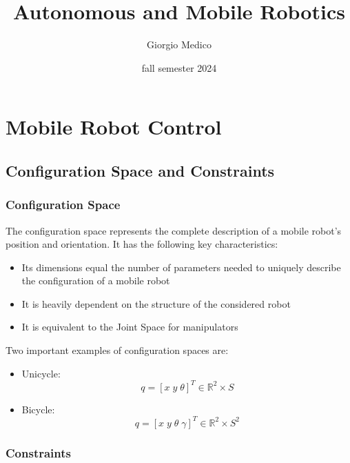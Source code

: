 \documentclass[openany]{book}
\title{Autonomous and Mobile Robotics}
\author{Giorgio Medico}
\date{fall semester 2024}
\newcommand{\R}{\mathbb{R}}
\theoremstyle{definition}
\theoremstyle{remark}
\begin{document}
\maketitle
\tableofcontents

\part{Mobile Robot Control}

\chapter{Configuration Space and Constraints}

\section{Configuration Space}

The configuration space represents the complete description of a mobile robot's position and orientation. It has the following key characteristics:

\begin{itemize}
    \item Its dimensions equal the number of parameters needed to uniquely describe the configuration of a mobile robot
    \item It is heavily dependent on the structure of the considered robot
    \item It is equivalent to the Joint Space for manipulators
\end{itemize}

Two important examples of configuration spaces are:

\begin{itemize}
    \item Unicycle:
        \begin{equation}
            q = [x \; y \; \theta]^T \in \R^2 \times S
        \end{equation}
        
    \item Bicycle:
        \begin{equation}
            q = [x \; y \; \theta \; \gamma]^T \in \R^2 \times S^2
        \end{equation}
\end{itemize}

\section{Constraints}
\end{document}
